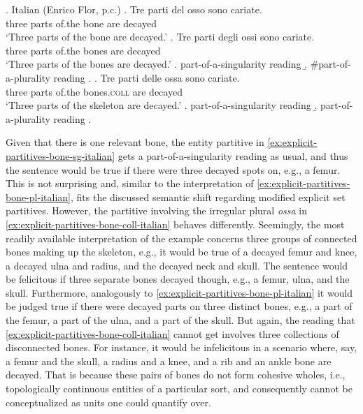 \ex.\label{ex:explicit-partitives-bone-italian} Italian (Enrico Flor, p.c.)
\ag. Tre   parti del    osso sono cariate.\label{ex:explicit-partitives-bone-sg-italian}\\
    three parts of.the bone are  decayed\\
    `Three parts of the bone are decayed.'
\bg. Tre parti degli ossi sono cariate.\label{ex:explicit-partitives-bone-pl-italian}\\
    three parts of.the bones are  decayed\\
    `Three parts of the bones are decayed.'
    \a. part-of-a-singularity reading
    \b. \#part-of-a-plurality reading
    \z.
\bg. Tre   parti delle  ossa sono cariate.\label{ex:explicit-partitives-bone-coll-italian}\\
    three parts of.the bones.\textsc{coll} are  decayed\\
    `Three parts of the skeleton are decayed.'
    \a. part-of-a-singularity reading
    \b. part-of-a-plurality reading
    \z.

Given that there is one relevant bone, the entity partitive in \ref{ex:explicit-partitives-bone-sg-italian} gets a part-of-a-singularity reading as usual, and thus the sentence would be true if there were three decayed spots on, e.g., a femur. This is not surprising and, similar to the interpretation of \ref{ex:explicit-partitives-bone-pl-italian}, fits the discussed semantic shift regarding modified explicit set partitives. However, the partitive involving the irregular plural \textit{ossa} in \ref{ex:explicit-partitives-bone-coll-italian} behaves differently. Seemingly, the most readily available interpretation of the example concerns three groups of connected bones making up the skeleton, e.g., it would be true of a decayed femur and knee, a decayed ulna and radius, and the decayed neck and skull. The sentence would be felicitous if three separate bones decayed though, e.g., a femur, ulna, and the skull. Furthermore, analogously to \ref{ex:explicit-partitives-bone-pl-italian} it would be judged true if there were decayed parts on three distinct bones, e.g., a part of the femur, a part of the ulna, and a part of the skull. But again, the reading that \ref{ex:explicit-partitives-bone-coll-italian} cannot get involves three collections of disconnected bones. For instance, it would be infelicitous in a scenario where, say, a femur and the skull, a radius and a knee, and a rib and an ankle bone are decayed. That is because these pairs of bones do not form cohesive wholes, i.e., topologically continuous entities of a particular sort, and consequently cannot be conceptualized as units one could quantify over.

